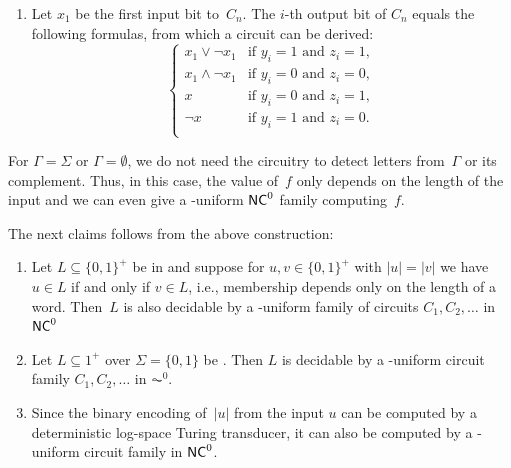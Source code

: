 \begin{remark}
\begin{enumerate}
		\item Let $x_1$ be the first input bit to~$C_n$.
		The $i$-th output bit of $C_n$ equals the following formulas,
		from which a circuit can be derived:
		\[
		\begin{cases}
			x_1 \lor \neg x_1       & \text{if } y_i = 1 \text{ and } z_i = 1, \\
			x_1 \land \neg x_1      & \text{if } y_i = 0 \text{ and } z_i = 0, \\						
			x       & \text{if } y_i = 0 \text{ and } z_i = 1, \\
			\neg x  & \text{if } y_i = 1 \text{ and } z_i = 0. \\												
		\end{cases}
		\]
	\end{enumerate}
	
	For $\Gamma = \Sigma$ or $\Gamma = \emptyset$,
	we do not need the circuitry to detect letters from~$\Gamma$
	or its complement. Thus, in this case, 
	the value of~$f$ only depends on the length of the input
	and we can even give a \LOGSPACE-uniform $\textup{\textsf{NC}}^0$ family
	computing~$f$.
	
	The next claims follows from the above construction:
	
	\begin{enumerate}
		\item Let $L \subseteq \{0,1\}^+$
		be in \LOGSPACE	and suppose for $u,v \in \{0,1\}^+$ with $|u|=|v|$ we have $u \in L$
		if and only if $v \in L$, i.e., membership depends only on the length of a word.
		Then~$L$ is also decidable by a \LOGSPACE-uniform family of circuits $C_1, C_2, \ldots$ in $\textup{\textsf{NC}}^0$
		
		\item Let $L \subseteq 1^+$ over $\Sigma = \{0,1\}$ be \LOGSPACE.
		Then $L$ is decidable by a \LOGSPACE-uniform circuit family $C_1,C_2,\ldots$ in $\AC^0$.
		
		\item Since the binary encoding of~$|u|$ from the input $u$ can be computed 
		by a deterministic log-space Turing transducer, it can also be computed
		by a \LOGSPACE-uniform circuit family in $\textup{\textsf{NC}}^0$.
	\end{enumerate}
\end{remark}

